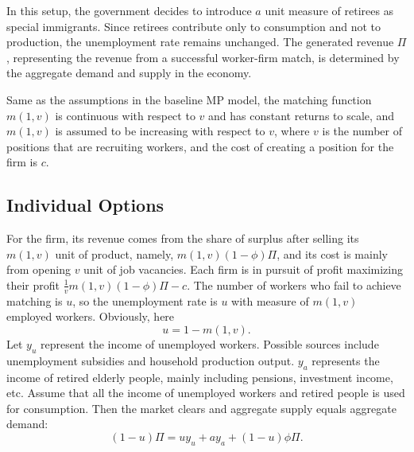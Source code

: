 \documentclass[ %
    final,
    scrbook,
    listoffigures,
    listoftables, 
    glossary]{cu-thesis}
\begin{document}
In this setup, the government decides to introduce $a$ unit measure of retirees as special immigrants. Since retirees contribute only to consumption and not to production, the unemployment rate remains unchanged. The generated revenue $\Pi$, representing the revenue from a successful worker-firm match, is determined by the aggregate demand and supply in the economy.

Same as the assumptions in the baseline MP model, the matching function $m(1, v)$ is continuous with respect to $v$ and has constant returns to scale, and $m(1, v)$ is assumed to be increasing with respect to $v$, where $v$ is the number of positions that are recruiting workers, and the cost of creating a position for the firm is $c$. 
\subsection{Individual Options}
For the firm, its revenue comes from the share of surplus after selling its $m(1,v)$ unit of product, namely, $m(1,v)(1-\phi)\Pi$, and its cost is mainly from opening $v$ unit of job vacancies. Each firm is in pursuit of profit maximizing their profit $\frac{1}{v}m(1,v)(1-\phi)\Pi-c$.
The number of workers who fail to achieve matching is $u$, so the unemployment rate is $u$ with measure of $m(1,v)$ employed workers. Obviously, here 
\begin{equation}
u = 1-m(1, v).
\end{equation}
Let $y_u$ represent the income of unemployed workers. Possible sources include unemployment subsidies and household production output. $y_a$ represents the income of retired elderly people, mainly including pensions, investment income, etc. Assume that all the income of unemployed workers and retired people is used for consumption. Then the market clears and aggregate supply equals aggregate demand:
\begin{equation}
    (1-u)\Pi = uy_u + ay_a + (1-u)\phi\Pi.
\end{equation}
\end{document}
